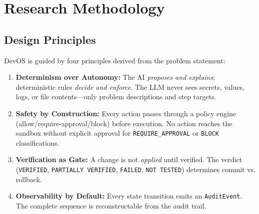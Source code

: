 \documentclass[conference,10pt,caption=false]{IEEEtran}
\begin{document}
\section{Research Methodology}
\label{sec:methodology}

\subsection{Design Principles}
\label{sec:design-principles}
DevOS is guided by four principles derived from the problem statement:
\begin{enumerate}[leftmargin=*, nosep]
    \item \textbf{Determinism over Autonomy:} The AI \textit{proposes and explains}; deterministic rules \textit{decide and enforce}. The LLM never sees secrets, values, logs, or file contents---only problem descriptions and step targets.
    \item \textbf{Safety by Construction:} Every action passes through a policy engine (allow/require-approval/block) before execution. No action reaches the sandbox without explicit approval for \texttt{REQUIRE\_APPROVAL} or \texttt{BLOCK} classifications.
    \item \textbf{Verification as Gate:} A change is not \textit{applied} until verified. The verdict (\texttt{VERIFIED}, \texttt{PARTIALLY VERIFIED}, \texttt{FAILED}, \texttt{NOT TESTED}) determines commit vs. rollback.
    \item \textbf{Observability by Default:} Every state transition emits an \texttt{AuditEvent}. The complete sequence is reconstructable from the audit trail.
\end{enumerate}
\end{document}
